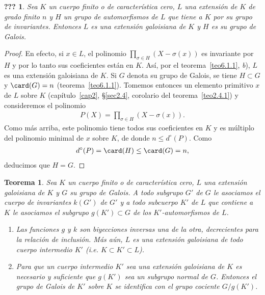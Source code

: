 \documentclass[oneside,bibtotoc,leqno,spanish]{amsbook}
\newcommand{\QED}{}%
\numberwithin{equation}{section}
\theoremstyle{defi}
\theoremstyle{note}
\newtheorem{theorem}{Teorema}
\newcommand{\namedname}{???}
\newtheorem*{namedthm}{\namedname}
\newenvironment{named}[1]%
	{\renewcommand{\namedname}{#1}%
	\begin{namedthm}}%
	{\end{namedthm}}
\theoremstyle{rem}
\numberwithin{theorem}{section}
\numberwithin{proposition}{section}
\numberwithin{definition}{section}
\numberwithin{lemma}{section}
\numberwithin{corollary}{section}
\numberwithin{example}{section}
\numberwithin{footnote}{section}%
\begin{document}
\begin{named}{Corolario del teorema 1}
Sea $K$ un cuerpo finito o de caracter\'istica cero, $L$ una extensi\'on de $K$ de grado finito $n$ y
$H$ un grupo de automorfismos de $L$ que tiene a $K$ por su grupo de invariantes. Entonces $L$ es una
extensi\'on galoisiana de $K$ y $H$ es su grupo de Galois.
\end{named}

\begin{proof}
En efecto, si $x\in L$, el polinomio $\prod_{\sigma\in H}(X-\sigma(x))$ es invariante
por $H$ y por
lo tanto sus coeficientes est\'an en $K$. As\'i, por el
teorema~\ref{teo6.1.1}, {\itshape b}), $L$ es una extensi\'on
galoisiana de $K$. Si $G$ denota su grupo de Galois, se tiene $H\subset G$ y $\card(G) = n$
(teorema~\ref{teo6.1.1}). Tomemos entonces un elemento primitivo $x$ de $L$ sobre $K$
(cap\'itulo~\ref{cap2},
\S\ref{sec2.4}, corolario del teorema~\ref{teo2.4.1}) y consideremos el polinomio
\begin{gather*}
P(X) = \prod_{\sigma\in H}(X-\sigma(x)).
\end{gather*}
Como m\'as arriba, este polinomio tiene todos sus coeficientes en $K$ y es m\'ultiplo
del polinomio minimal
de $x$ sobre $K$, de donde $n\leq d^{\circ}(P)$. Como
\begin{gather*}
d^{\circ}(P) = \card(H)\leq\card(G) = n,
\end{gather*}
deducimos que $H = G$. \QED
\end{proof}

\begin{theorem}\label{teo6.1.2}
Sea $K$ un cuerpo finito o de caracter\'istica cero, $L$ una extensi\'on galoisiana de $K$
y $G$ su grupo
de Galois. A todo subgrupo $G'$ de $G$ le asociamos  el cuerpo de invariantes $k(G')$
de $G'$ y a todo
subcuerpo $K'$ de $L$ que contiene a $K$ le asociamos el subgrupo $g(K')\subset G$ de
los $K'$-automorfismos
de $L$.
\begin{enumerate}%
\item[a)] Las funciones $g$ y $k$ son biyecciones inversas una de la otra, decrecientes
para la relaci\'on de
inclusi\'on. M\'as a\'un, $L$ es una extensi\'on galoisiana de todo cuerpo intermedio $K'$
(i.e. $K\subset K'\subset L$).
\item[b)] Para que un cuerpo intermedio $K'$ sea una extensi\'on galoisiana de $K$ es
necesario y suficiente que
$g(K')$ sea un subgrupo normal de $G$. Entonces el grupo de Galois de $K'$ sobre $K$
se identifica con el
grupo cociente $G/g(K')$.
\end{enumerate}%
\end{theorem}
\end{document}
